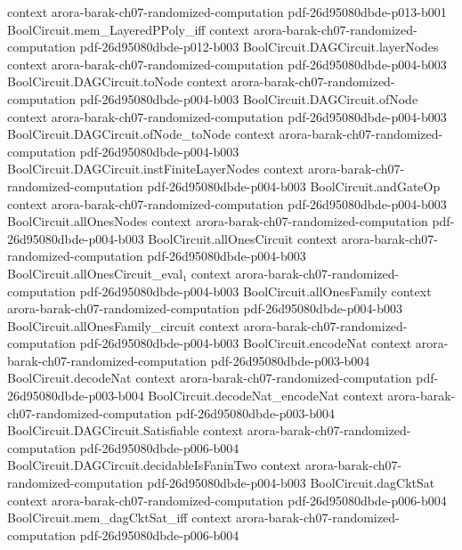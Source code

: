 \begin{theorem}
  {context}
  {arora-barak-ch07-randomized-computation}
  {pdf-26d95080dbde-p013-b001}
\proofstep
  {BoolCircuit.mem_LayeredPPoly_iff}
  {context}
  {arora-barak-ch07-randomized-computation}
  {pdf-26d95080dbde-p012-b003}
\proofstep
  {BoolCircuit.DAGCircuit.layerNodes}
  {context}
  {arora-barak-ch07-randomized-computation}
  {pdf-26d95080dbde-p004-b003}
\proofstep
  {BoolCircuit.DAGCircuit.toNode}
  {context}
  {arora-barak-ch07-randomized-computation}
  {pdf-26d95080dbde-p004-b003}
\proofstep
  {BoolCircuit.DAGCircuit.ofNode}
  {context}
  {arora-barak-ch07-randomized-computation}
  {pdf-26d95080dbde-p004-b003}
\proofstep
  {BoolCircuit.DAGCircuit.ofNode_toNode}
  {context}
  {arora-barak-ch07-randomized-computation}
  {pdf-26d95080dbde-p004-b003}
\proofstep
  {BoolCircuit.DAGCircuit.instFiniteLayerNodes}
  {context}
  {arora-barak-ch07-randomized-computation}
  {pdf-26d95080dbde-p004-b003}
\proofstep
  {BoolCircuit.andGateOp}
  {context}
  {arora-barak-ch07-randomized-computation}
  {pdf-26d95080dbde-p004-b003}
\proofstep
  {BoolCircuit.allOnesNodes}
  {context}
  {arora-barak-ch07-randomized-computation}
  {pdf-26d95080dbde-p004-b003}
\proofstep
  {BoolCircuit.allOnesCircuit}
  {context}
  {arora-barak-ch07-randomized-computation}
  {pdf-26d95080dbde-p004-b003}
\proofstep
  {BoolCircuit.allOnesCircuit_eval₁}
  {context}
  {arora-barak-ch07-randomized-computation}
  {pdf-26d95080dbde-p004-b003}
\proofstep
  {BoolCircuit.allOnesFamily}
  {context}
  {arora-barak-ch07-randomized-computation}
  {pdf-26d95080dbde-p004-b003}
\proofstep
  {BoolCircuit.allOnesFamily_circuit}
  {context}
  {arora-barak-ch07-randomized-computation}
  {pdf-26d95080dbde-p004-b003}
\proofstep
  {BoolCircuit.encodeNat}
  {context}
  {arora-barak-ch07-randomized-computation}
  {pdf-26d95080dbde-p003-b004}
\proofstep
  {BoolCircuit.decodeNat}
  {context}
  {arora-barak-ch07-randomized-computation}
  {pdf-26d95080dbde-p003-b004}
\proofstep
  {BoolCircuit.decodeNat_encodeNat}
  {context}
  {arora-barak-ch07-randomized-computation}
  {pdf-26d95080dbde-p003-b004}
\proofstep
  {BoolCircuit.DAGCircuit.Satisfiable}
  {context}
  {arora-barak-ch07-randomized-computation}
  {pdf-26d95080dbde-p006-b004}
\proofstep
  {BoolCircuit.DAGCircuit.decidableIsFaninTwo}
  {context}
  {arora-barak-ch07-randomized-computation}
  {pdf-26d95080dbde-p004-b003}
\proofstep
  {BoolCircuit.dagCktSat}
  {context}
  {arora-barak-ch07-randomized-computation}
  {pdf-26d95080dbde-p006-b004}
\proofstep
  {BoolCircuit.mem_dagCktSat_iff}
  {context}
  {arora-barak-ch07-randomized-computation}
  {pdf-26d95080dbde-p006-b004}

\end{theorem}
